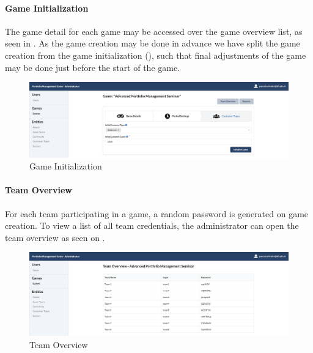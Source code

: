 \paragraph{Game Initialization}
The game detail for each game may be accessed over the game overview list, as seen in .  As the game creation may be done in advance we have split the game creation from the game initialization (), such that final adjustments of the game may be done just before the start of the game.
\begin{figure}[h!]
  \centering
  \includegraphics[scale=0.2]{img/application-overview/administrator/04_game_initialization.png}
  \caption{Game Initialization}
  \label{fig:game_initialization}
\end{figure}

\paragraph{Team Overview}
For each team participating in a game, a random password is generated on game creation. To view a list of all team credentials, the administrator can open the team overview as seen on .
\begin{figure}[h!]
  \centering
  \includegraphics[scale=0.2]{img/application-overview/administrator/06_team_login_overview.png}
  \caption{Team Overview}
  \label{fig:team_overview}
\end{figure}

